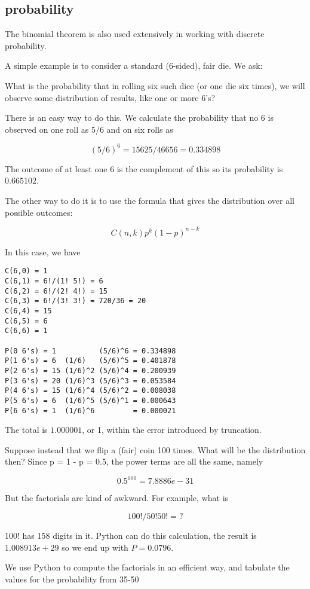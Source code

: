 \documentclass[11pt, oneside]{article}   	%
\begin{document}
\subsection*{probability}
The binomial theorem is also used extensively in working with discrete probability.  

A simple example is to consider a standard (6-sided), fair die.  We ask: 

What is the probability that in rolling six such dice (or one die six times), we will observe some distribution of results, like one or more 6's?

There is an easy way to do this.  We calculate the probability that no 6 is observed on one roll as 5/6 and on six rolls as

\[ (5/6)^6 = 15625/46656 = 0.334898 \]

The outcome of at least one 6 is the complement of this so its probability is $0.665102$.

The other way to do it is to use the formula that gives the distribution over all possible outcomes:

\[ C(n,k) p^k (1-p)^{n-k} \]

In this case, we have 
\large
\begin{verbatim}
C(6,0) = 1
C(6,1) = 6!/(1! 5!) = 6
C(6,2) = 6!/(2! 4!) = 15
C(6,3) = 6!/(3! 3!) = 720/36 = 20
C(6,4) = 15
C(6,5) = 6
C(6,6) = 1

P(0 6's) = 1          (5/6)^6 = 0.334898
P(1 6's) = 6  (1/6)   (5/6)^5 = 0.401878
P(2 6's) = 15 (1/6)^2 (5/6)^4 = 0.200939
P(3 6's) = 20 (1/6)^3 (5/6)^3 = 0.053584
P(4 6's) = 15 (1/6)^4 (5/6)^2 = 0.008038
P(5 6's) = 6  (1/6)^5 (5/6)^1 = 0.000643
P(6 6's) = 1  (1/6)^6         = 0.000021
\end{verbatim}
\Large
The total is $1.000001$, or 1, within the error introduced by truncation.

Suppose instead that we flip a (fair) coin 100 times.  What will be the distribution then? Since p = 1 - p = 0.5, the power terms are all the same, namely

\[ 0.5^{100} = 7.8886e-31 \]

But the factorials are kind of awkward.  For example, what is

\[ 100! / 50! 50! = ? \]

100! has 158 digits in it.  Python can do this calculation, the result is $1.008913e+29$ so we end up with $P = 0.0796$.

We use Python to compute the factorials in an efficient way, and tabulate the values for the probability from 35-50
\end{document}
